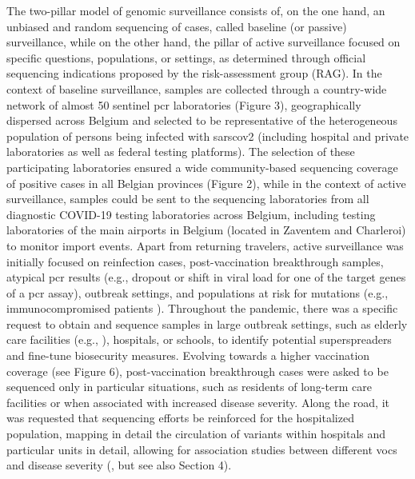 The two-pillar model of genomic surveillance consists of, on the one hand, an unbiased and random sequencing of cases, called baseline (or passive) surveillance, while on the other hand, the pillar of active surveillance focused on specific questions, populations, or settings, as determined through official sequencing indications proposed by the risk-assessment group (RAG).
In the context of baseline surveillance, samples are collected through a country-wide network of almost 50 sentinel \gls{pcr} laboratories (Figure 3), geographically dispersed across Belgium and selected to be representative of the heterogeneous population of persons being infected with \gls{sarscov2} (including hospital and private laboratories as well as federal testing platforms).
The selection of these participating laboratories ensured a wide community-based sequencing coverage of positive cases in all Belgian provinces (Figure 2), while in the context of active surveillance, samples could be sent to the sequencing laboratories from all diagnostic COVID-19 testing laboratories across Belgium, including testing laboratories of the main airports in Belgium (located in Zaventem and Charleroi) to monitor import events.
Apart from returning travelers, active surveillance was initially focused on reinfection cases, post-vaccination breakthrough samples, atypical \gls{pcr} results (e.g., dropout or shift in viral load for one of the target genes of a \gls{pcr} assay), outbreak settings, and populations at risk for mutations (e.g., immunocompromised patients \citep{vandermoeren2022viral}).
Throughout the pandemic, there was a specific request to obtain and sequence samples in large outbreak settings, such as elderly care facilities (e.g., \citep{vuylsteke2022role}), hospitals, or schools, to identify potential superspreaders and fine-tune biosecurity measures.
Evolving towards a higher vaccination coverage (see Figure 6), post-vaccination breakthrough cases were asked to be sequenced only in particular situations, such as residents of long-term care facilities or when associated with increased disease severity.
Along the road, it was requested that sequencing efforts be reinforced for the hospitalized population, mapping in detail the circulation of variants within hospitals and particular units in detail, allowing for association studies between different \gls{voc}s and disease severity (\citep{vangoethem2022severity,vangoethem2022clinical}, but see also Section 4).

